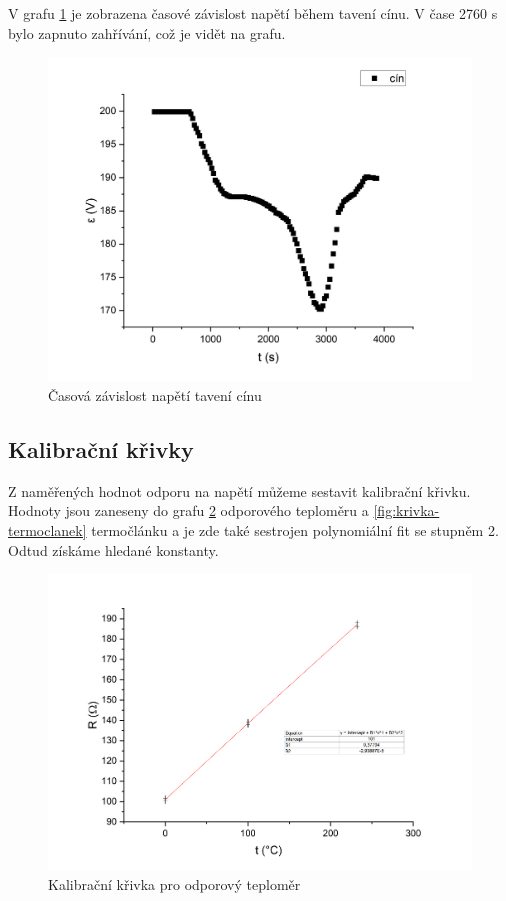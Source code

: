 V grafu \ref{fig:napeti-na-case-cin} je zobrazena časové závislost napětí během tavení cínu. V čase 2760 s bylo zapnuto zahřívání, což je vidět na grafu.

\begin{figure}[h]
    \centering
    \includegraphics[width=0.5\linewidth]{8 - Kalibrace odporového teploměru a termočlánku//Prototkol - kalibrace teploměru//img/Závislost epsilon na čase, cín.png}
    \caption{Časová závislost napětí tavení cínu}
    \label{fig:napeti-na-case-cin}
\end{figure}

\subsection{Kalibrační křivky}
Z naměřených hodnot odporu na napětí můžeme sestavit kalibrační křivku. Hodnoty jsou zaneseny do grafu \ref{fig:krivka-odpor} odporového teploměru a \ref{fig:krivka-termoclanek} termočlánku a je zde také sestrojen polynomiální fit se stupněm 2. Odtud získáme hledané konstanty.

\begin{figure}[h]
    \centering
    \includegraphics[width=0.8\linewidth]{8 - Kalibrace odporového teploměru a termočlánku//Prototkol - kalibrace teploměru//img/Závislost R na t, parabola.png}
    \caption{Kalibrační křivka pro odporový teploměr}
    \label{fig:krivka-odpor}
\end{figure}

